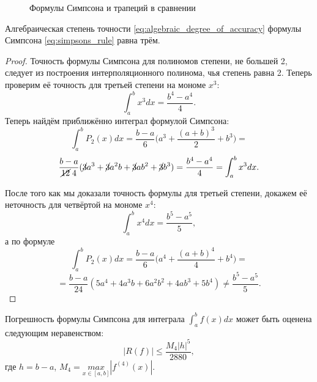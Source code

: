 \documentclass[../main.tex]{subfile}
\begin{document}
\begin{figure}[ht]
	\caption*{Формулы Симпсона и трапеций в сравнении}
\end{figure}

\begin{lemma}
	Алгебраическая степень точности \eqref{eq:algebraic_degree_of_accuracy}
	формулы Симпсона \eqref{eq:simpsons_rule} равна трём.
\end{lemma}

\begin{proof}
	Точность формулы Симпсона для полиномов степени, не большей 2, следует
	из построения интерполяционного полинома, чья степень равна 2. Теперь
	проверим её точность для третьей степени на мономе $x^3$:
	\[\int_a^b x^3dx=\frac{b^4-a^4}{4}.\]
	Теперь найдём приближённо интеграл формулой Симпсона:
	\[\int_a^b P_2(x)dx=\frac{b-a}{6}\Big(a^3+\frac{(a+b)^3}{2}+b^3\Big)=\]
	\[\frac{b-a}{\cancel{12}\;4}(\cancel{3}a^3+\cancel{3}a^2b+\cancel{3}ab^2
	+\cancel{3}b^3)=\frac{b^4-a^4}{4}=\int_a^b x^3dx.\]

	После того как мы доказали точность формулы для третьей степени, докажем
	её неточность для четвёртой на мономе $x^4$:
	\[\int_a^b x^4dx=\frac{b^5-a^5}{5},\]
	а по формуле
	\[\int_a^b P_2(x)dx=\frac{b-a}{6}\Big(a^4+\frac{(a+b)^4}{4}+b^4\Big)=\]
	\[=\frac{b-a}{24}(5a^4+4a^3b+6a^2b^2+4ab^3+5b^4)\ne\frac{b^5-a^5}{5}.\]
\end{proof}

\begin{theorem}
	Погрешность формулы Симпсона для интеграла $\int_a^b f(x)dx$ может быть
	оценена следующим неравенством:
	\[\boxed{|R(f)|\le\frac{M_4|h|^5}{2880}},\]
	где $h=b-a$, $M_4=\underset{x\in[a,b]}{max}|f^{(4)}(x)|.$
\end{theorem}
\end{document}
